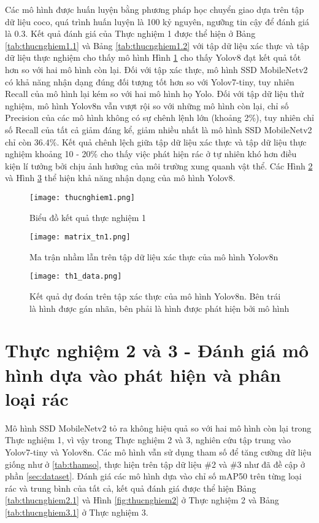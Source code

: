 \documentclass[../the.tex]{subfiles}
\begin{document}
{\fontsize{13}{12} \selectfont
    Các mô hình được huấn luyện bằng phương pháp học chuyển giao dựa trên tập dữ liệu coco, quá trình huấn luyện là 100 kỷ nguyên, ngưỡng tin cậy để đánh giá là 0.3.
    Kết quả đánh giá của Thực nghiệm 1 được thể hiện ở Bảng \ref{tab:thucnghiem1.1} 
    và Bảng \ref{tab:thucnghiem1.2} với tập dữ liệu xác thực và tập dữ liệu thực nghiệm cho thấy mô hình 
    Hình \ref{fig:thucnghiem1} cho thấy Yolov8 đạt kết quả tốt hơn so với hai mô hình còn lại. Đối với tập xác thực, mô hình SSD MobileNetv2 có khả năng nhận dạng đúng đối tượng tốt hơn so với Yolov7-tiny, tuy nhiên Recall của mô hình lại kém so với hai mô hình họ Yolo.
    Đối với tập dữ liệu thử nghiệm, mô hình Yolov8n vẫn vượt rội so với những mô hình còn lại, chỉ số Precision của các mô hình không có sự chênh lệnh lớn (khoảng 2\%), tuy nhiên chỉ số Recall của tất cả giảm đáng kể, giảm nhiều nhất là mô hình SSD MobileNetv2 chỉ còn 36.4\%. 
    Kết quả chênh lệch giữa tập dữ liệu xác thực và tập dữ liệu thực nghiệm khoảng 10 - 20\% cho thấy việc phát hiện rác ở tự nhiên khó hơn điều kiện lí tưởng bởi chịu ảnh hưởng của môi trường xung quanh vật thể.
    Các Hình \ref{fig:thucnghiem1.2} và Hình \ref{fig:thucnghiem1.3} thể hiện khả năng nhận dạng của mô hình Yolov8.

}

\begin{figure}[H]
    \centering
    \texttt{[image: thucnghiem1.png]}
    \caption{Biểu đồ kết quả thực nghiệm 1}
    \label{fig:thucnghiem1}
\end{figure}

\begin{figure}[H]
	\centering
	\texttt{[image: matrix\_tn1.png]}
	\caption{Ma trận nhầm lẫn trên tập dữ liệu xác thực của mô hình Yolov8n}
	\label{fig:thucnghiem1.2}
\end{figure}

\begin{figure}[H]
	\centering
	\texttt{[image: th1\_data.png]}
	\caption{Kết quả dự đoán trên tập xác thực của mô hình Yolov8n. Bên trái là hình được gán nhãn, bên phải là hình được phát hiện bởi mô hình}
	\label{fig:thucnghiem1.3}
\end{figure}

\section{Thực nghiệm 2 và 3 - Đánh giá mô hình dựa vào phát hiện và phân loại rác}
 {\fontsize{13}{12} \selectfont
  Mô hình SSD MobileNetv2 tỏ ra không hiệu quả so với hai mô hình còn lại trong Thực nghiệm 1, vì vậy trong Thực nghiệm 2 và 3, nghiên cứu tập trung vào Yolov7-tiny và Yolov8n. Các mô hình vẫn sử dụng tham số để tăng cường dữ liệu giống như ở \ref{tab:thamso}, thực hiện trên tập dữ liệu \#2 và \#3 như đã đề cập ở phần \ref{sec:dataset}.
  Đánh giá các mô hình dựa vào chỉ số mAP50 trên từng loại rác và trung bình của tất cả, kết quả đánh giá được thể hiện Bảng \ref{tab:thucnghiem2.1} và Hình \ref{fig:thucnghiem2} ở Thực nghiệm 2 và Bảng \ref{tab:thucnghiem3.1} ở Thực nghiệm 3.
 }
\end{document}
